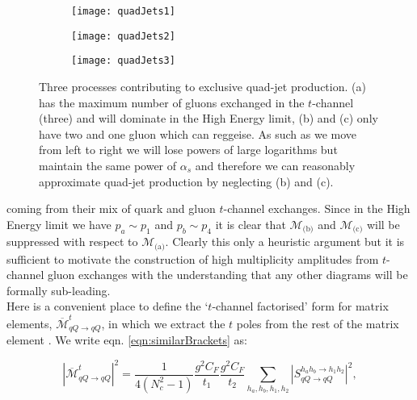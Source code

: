 		\begin{figure}[hbt]
			\centering
			\begin{subfigure}[b]{0.31\textwidth}
				\texttt{[image: quadJets1]}
				\caption{}
				\label{fig:quadJets1}
			\end{subfigure}
			\begin{subfigure}[b]{0.31\textwidth}
				\texttt{[image: quadJets2]}
				\caption{}
				\label{fig:quadJets2}
			\end{subfigure}
			\begin{subfigure}[b]{0.31\textwidth}
				\texttt{[image: quadJets3]}
				\caption{}
				\label{fig:quadJets3}
			\end{subfigure}
			\caption{Three processes contributing to exclusive quad-jet production. (a) has the
			maximum number of gluons exchanged in the $t$-channel (three) and will dominate in the High
			Energy limit, (b) and (c) only have two and one gluon which can reggeise.  As such as we move
			from left to right we will lose powers of large logarithms but maintain the same power of
			$\alpha_s$ and therefore we can reasonably approximate quad-jet production by neglecting
			(b) and (c).}
			\label{fig:quadJets}
		\end{figure}

		coming from their mix of quark and gluon $t$-channel exchanges.  Since in the High
		Energy limit we have $p_a\sim p_1$ and $p_b\sim p_4$ it is clear that $\mathcal{M}_{\text{(b)}}$
		and $\mathcal{M}_{\text{(c)}}$ will be suppressed with respect to $\mathcal{M}_{\text{(a)}}$.
		Clearly this only a heuristic argument but it is sufficient to motivate the construction of
		high multiplicity amplitudes from $t$-channel gluon exchanges with the understanding that any
		other diagrams will be formally sub-leading.\\Here is a convenient place to define the `$t$-channel
		factorised' form for matrix elements, $\overline{\mathcal{M}}^t_{qQ\rightarrow qQ}$, in which we
		extract the $t$ poles from the rest of the matrix element \cite{Andersen:2009nu}.  We write
		eqn. \eqref{eqn:similarBrackets} as:

		\begin{equation}
			|\overline{\mathcal{M}}^t_{qQ\rightarrow qQ}|^2 = \frac{1}{4(N_c^2-1)}
			\frac{g^2C_F}{t_1}\frac{g^2C_F}{t_2} \sum_{h_a, h_b, h_1, h_2}
			|S_{qQ\rightarrow qQ}^{h_ah_b\rightarrow h_1h_2}|^2,
			\label{eqn:factorised}
		\end{equation}

